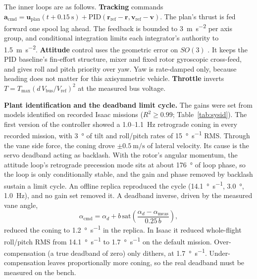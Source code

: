 \documentclass[conference]{IEEEtran}
\begin{document}
The inner loops are as follows. \textbf{Tracking} commands $\mathbf{a}_{\text{cmd}} = \mathbf{u}_{\text{plan}}(t + \SI{0.15}{\second}) + \text{PID}(\mathbf{r}_{\text{ref}} - \mathbf{r}, \mathbf{v}_{\text{ref}} - \mathbf{v})$. The plan's thrust is fed forward one spool lag ahead. The feedback is bounded to \SI{3}{\metre\per\second\squared} per axis group, and conditional integration limits each integrator's authority to \SI{1.5}{\metre\per\second\squared}. \textbf{Attitude} control uses the geometric error on $SO(3)$ \cite{b25}. It keeps the PID baseline's fin-effort structure, mixer and fixed rotor gyroscopic cross-feed, and gives roll and pitch priority over yaw. Yaw is rate-damped only, because heading does not matter for this axisymmetric vehicle. \textbf{Throttle} inverts $T = T_{\max}(d\,V_{\text{bus}}/V_{\text{ref}})^2$ at the measured bus voltage.

\textbf{Plant identification and the deadband limit cycle.} The gains were set from models identified on recorded Isaac missions ($R^2 \ge 0.99$; Table~\ref{tab:sysid}). The first version of the controller showed a 1.0--\SI{1.1}{\hertz} retrograde coning in every recorded mission, with \SI{3}{\degree} of tilt and roll/pitch rates of \SI{15}{\degree\per\second} RMS. Through the vane side force, the coning drove $\pm\SI{0.5}{\metre\per\second}$ of lateral velocity. Its cause is the servo deadband acting as backlash. With the rotor's angular momentum, the attitude loop's retrograde precession mode sits at about \SI{176}{\degree} of loop phase, so the loop is only conditionally stable, and the gain and phase removed by backlash sustain a limit cycle. An offline replica reproduced the cycle (\SI{14.1}{\degree\per\second}, \SI{3.0}{\degree}, \SI{1.0}{\hertz}), and no gain set removed it. A deadband inverse, driven by the measured vane angle,
\begin{equation}
\alpha_{\text{cmd}} = \alpha_d + b\,\text{sat}\!\left(\frac{\alpha_d - \alpha_{\text{meas}}}{0.25\,b}\right),
\label{eq:deadband_inverse}
\end{equation}
reduced the coning to \SI{1.2}{\degree\per\second} in the replica. In Isaac it reduced whole-flight roll/pitch RMS from \SI{14.1}{\degree\per\second} to \SI{1.7}{\degree\per\second} on the default mission. Over-compensation (a true deadband of zero) only dithers, at \SI{1.7}{\degree\per\second}. Under-compensation leaves proportionally more coning, so the real deadband must be measured on the bench.
\end{document}
